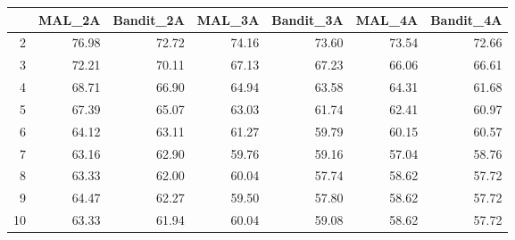 \begin{table}[ht]
\centering
\begin{tabular}{rrrrrrr}
  \hline
 & MAL\_2A & Bandit\_2A & MAL\_3A & Bandit\_3A & MAL\_4A & Bandit\_4A \\ 
  \hline
2 & 76.98 & 72.72 & 74.16 & 73.60 & 73.54 & 72.66 \\ 
  3 & 72.21 & 70.11 & 67.13 & 67.23 & 66.06 & 66.61 \\ 
  4 & 68.71 & 66.90 & 64.94 & 63.58 & 64.31 & 61.68 \\ 
  5 & 67.39 & 65.07 & 63.03 & 61.74 & 62.41 & 60.97 \\ 
  6 & 64.12 & 63.11 & 61.27 & 59.79 & 60.15 & 60.57 \\ 
  7 & 63.16 & 62.90 & 59.76 & 59.16 & 57.04 & 58.76 \\ 
  8 & 63.33 & 62.00 & 60.04 & 57.74 & 58.62 & 57.72 \\ 
  9 & 64.47 & 62.27 & 59.50 & 57.80 & 58.62 & 57.72 \\ 
  10 & 63.33 & 61.94 & 60.04 & 59.08 & 58.62 & 57.72 \\ 
   \hline
\end{tabular}
\end{table}
